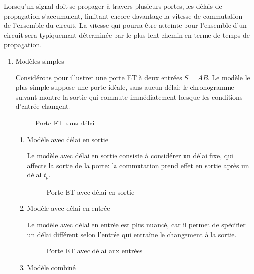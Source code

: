 \documentclass[11pt]{article}
\begin{document}
Lorsqu'un signal doit se propager à travers plusieurs portes, les
délais de propagation s'accumulent, limitant encore davantage la
vitesse de commutation de l'ensemble du circuit. La vitesse qui pourra
être atteinte pour l'ensemble d'un circuit sera typiquement déterminée
par le plus lent chemin en terme de temps de propagation.

\begin{enumerate}
\item Modèles simples
\label{sec:org1201d42}

Considérons pour illustrer une porte ET à deux entrées \(S = A B\). 
Le modèle le plus simple suppose une porte idéale, sans aucun délai:
le chronogramme suivant montre la sortie qui commute immédiatement
lorsque les conditions d'entrée changent.

\begin{figure}[htbp]
\centering

\caption{\label{fig:orgb7f0bf1}Porte ET sans délai}
\end{figure}

\begin{enumerate}
\item Modèle avec délai en sortie
\label{sec:orgf8f9718}

Le modèle avec délai en sortie consiste à considérer un délai fixe,
qui affecte la sortie de la porte: la commutation prend effet en
sortie après un délai \(t_p\).


\begin{figure}[htbp]
\centering

\caption{\label{fig:orgcb36f27}Porte ET avec délai en sortie}
\end{figure}

\item Modèle avec délai en entrée
\label{sec:org9c3bd4f}

Le modèle avec délai en entrée est plus nuancé, car il permet de
spécifier un délai différent selon l'entrée qui entraîne le changement
à la sortie.

\begin{figure}[htbp]
\centering

\caption{\label{fig:org64fe81f}Porte ET avec délai aux entrées}
\end{figure}

\item Modèle combiné
\label{sec:org49a39e0}


\end{enumerate}
\end{enumerate}
\end{document}
